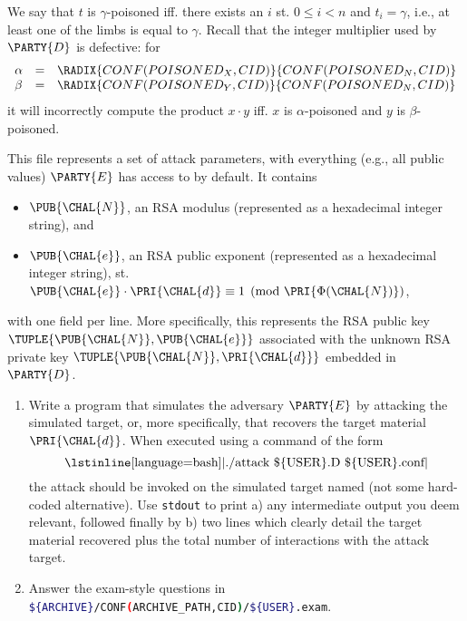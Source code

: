\begin{itemize}
\[      \]
      We say that $t$ is $\gamma$-poisoned iff. there exists an $i$ st.
      $0 \leq i < n$ and $t_i = \gamma$, i.e., at least one of the limbs 
      is equal to $\gamma$.  Recall that the integer multiplier used by
      $\PARTY{D}$ is defective: for
      \[
      \begin{array}{lcl}
      \alpha &=& \RADIX{CONF(POISONED_X,CID)}{CONF(POISONED_N,CID)} \\
      \beta  &=& \RADIX{CONF(POISONED_Y,CID)}{CONF(POISONED_N,CID)} \\
      \end{array}
      \]
      it will incorrectly compute the product $x \cdot y$ iff. $x$ is 
      $\alpha$-poisoned and $y$ is $\beta$-poisoned.
\end{itemize}


This file represents a set of attack parameters, with everything (e.g.,
all public values) $\PARTY{E}$ has access to by default.  It contains 

\begin{itemize}
\item $\PUB{\CHAL{N}}$,
      an RSA modulus
      (represented as a                   hexadecimal integer string),
      and
\item $\PUB{\CHAL{e}}$,
      an RSA public exponent
      (represented as a                   hexadecimal integer string),
      st. $\PUB{\CHAL{e}} \cdot \PRI{\CHAL{d}} \equiv 1 \pmod{\PRI{\Phi(\CHAL{N})}}$,
\end{itemize}

\noindent
with one field per line.
More specifically, this represents the RSA public key 
$
\TUPLE{ \PUB{\CHAL{N}}, \PUB{\CHAL{e}} }
$
associated with the unknown RSA private key 
$
\TUPLE{ \PUB{\CHAL{N}}, \PRI{\CHAL{d}} }
$
embedded in $\PARTY{D}$.



\begin{enumerate}
\item Write a program that simulates the adversary $\PARTY{E}$ by attacking
      the simulated target, or, more specifically, that recovers the target 
      material $\PRI{\CHAL{d}}$.  
      When executed using a command of the form
      \[
      \mbox{\lstinline[language={bash}]|./attack \$\{USER\}.D \$\{USER\}.conf|}
      \]
      the attack should be invoked on the simulated target named (not some
      hard-coded alternative).  Use \lstinline[language={bash}]{stdout} to 
      print 
      a) any intermediate output you deem relevant, followed finally by 
      b) two lines which clearly detail the target material recovered plus
         the total number of interactions with the attack target.
\item Answer the exam-style questions in  
      \lstinline[language={bash}]|${ARCHIVE}/CONF(ARCHIVE_PATH,CID)/${USER}.exam|.
\end{enumerate}

